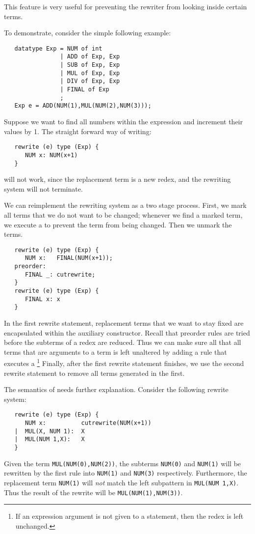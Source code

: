    This feature is very useful for preventing the rewriter from
looking inside certain terms. 

   To demonstrate, consider the simple following example:
\begin{verbatim}
   datatype Exp = NUM of int 
                | ADD of Exp, Exp
                | SUB of Exp, Exp
                | MUL of Exp, Exp
                | DIV of Exp, Exp
                | FINAL of Exp
                ;
   Exp e = ADD(NUM(1),MUL(NUM(2),NUM(3)));
\end{verbatim}

Suppose we want to find all numbers within 
the expression  and increment their values by 1.  
The straight forward way of writing:
\begin{verbatim}
   rewrite (e) type (Exp) {
      NUM x: NUM(x+1) 
   }
\end{verbatim}
\noindent will not work, since the replacement term is a new redex,
and the rewriting system will not terminate.

We can reimplement the rewriting system as a two stage process.
First, we mark all terms that we do not want to be changed; whenever we
find a marked term, we execute a  to prevent the term
from being changed.  Then we unmark the terms.
\begin{verbatim}
   rewrite (e) type (Exp) {
      NUM x:   FINAL(NUM(x+1));
   preorder:
      FINAL _: cutrewrite;
   }
   rewrite (e) type (Exp) {
      FINAL x: x
   }
\end{verbatim}

In the first rewrite statement, replacement terms that we 
want to stay fixed are encapsulated
within the auxiliary  constructor.  
Recall that preorder rules are tried before the subterms of a redex are 
reduced.  Thus we can make sure all that
all terms that are arguments to a  term is left unaltered
by adding a  rule that executes a \footnote{
If an expression argument is not given to a  statement, then
the redex is left unchanged.}
Finally, after the first rewrite statement finishes, we use 
the second rewrite statement to remove all  terms generated
in the first.

The semantics of  needs further explanation.  Consider
the following rewrite system:
\begin{verbatim}
   rewrite (e) type (Exp) {
      NUM x:          cutrewrite(NUM(x+1))
   |  MUL(X, NUM 1):  X
   |  MUL(NUM 1,X):   X
   }
\end{verbatim}
Given the term \verb|MUL(NUM(0),NUM(2))|, the subterms \verb|NUM(0)|
and \verb|NUM(1)|
will be rewritten by the first rule
into \verb|NUM(1)| and \verb|NUM(3)| respectively.
Furthermore, the replacement term \verb|NUM(1)| will {\em not} match
the left subpattern in \verb|MUL(NUM 1,X)|.  Thus the result of the rewrite
will be \verb|MUL(NUM(1),NUM(3))|.

